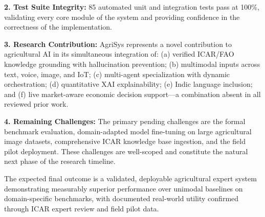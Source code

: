 \documentclass[12pt,a4paper]{article}
\begin{document}
\textbf{2. Test Suite Integrity:} 85 automated unit and integration tests pass at 100\%, validating every core module of the system and providing confidence in the correctness of the implementation.

\textbf{3. Research Contribution:} AgriSys represents a novel contribution to agricultural AI in its simultaneous integration of: (a) verified ICAR/FAO knowledge grounding with hallucination prevention; (b) multimodal inputs across text, voice, image, and IoT; (c) multi-agent specialization with dynamic orchestration; (d) quantitative XAI explainability; (e) Indic language inclusion; and (f) live market-aware economic decision support---a combination absent in all reviewed prior work.

\textbf{4. Remaining Challenges:} The primary pending challenges are the formal benchmark evaluation, domain-adapted model fine-tuning on large agricultural image datasets, comprehensive ICAR knowledge base ingestion, and the field pilot deployment. These challenges are well-scoped and constitute the natural next phase of the research timeline.

The expected final outcome is a validated, deployable agricultural expert system demonstrating measurably superior performance over unimodal baselines on domain-specific benchmarks, with documented real-world utility confirmed through ICAR expert review and field pilot data.

\clearpage


\end{document}
